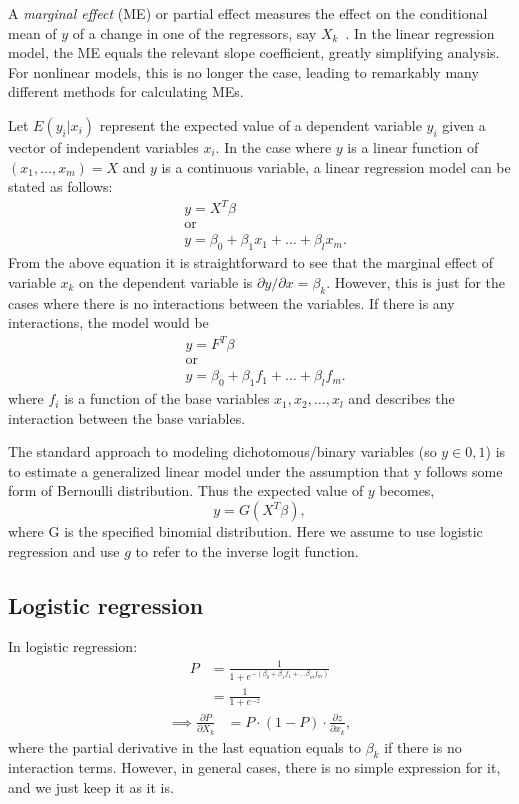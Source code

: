 A \emph{marginal effect} (ME) or partial effect measures the effect on the
conditional mean of $y$ of a change in one of the regressors, say
$X_k$~\cite{cameron2009}. In the linear regression model, the ME equals the
relevant slope coefficient, greatly simplifying analysis. For nonlinear models,
this is no longer the case, leading to remarkably many different methods for
calculating MEs.

Let $E(y_i | x_i)$ represent the expected value of a dependent variable $y_i$
given a vector of independent variables $x_i$. In the case where $y$ is a
linear function of $(x_1, \dots, x_m) = X$ and $y$ is a continuous variable, a
linear regression model can be stated as follows:
\begin{align*}
    & y = X^T\beta \\
    & \text{or} \\
    & y = \beta_0 + \beta_1 x_1 +  \dots  + \beta_l x_m.
\end{align*}
From the above equation it is straightforward to see that the marginal effect of
variable $x_k$ on the dependent variable is $\partial y / \partial x =
\beta_k$. However, this is just for the cases where there is no
interactions between the variables. If there is any interactions, the
model would be
\begin{align*}
    & y = F^T\beta \\
    & \text{or} \\
    & y = \beta_0 + \beta_1 f_1 + \dots + \beta_l f_m.
\end{align*}
where $f_i$ is a function of the base variables $x_1, x_2, \dots, x_l$ and describes the
interaction between the base variables.

The standard approach to modeling dichotomous/binary variables
(so $y \in {0, 1}$) is to estimate a generalized linear model under the
assumption that y follows some form of Bernoulli distribution. Thus the expected
value of $y$ becomes,
\begin{equation*}
    y = G(X^T \beta),
  \end{equation*}
where G is the specified binomial distribution. Here we assume to use
logistic regression and use $g$ to refer to the inverse logit function.

\subsection{Logistic regression} %
\label{sub:logistic_regression}
In logistic regression:
\begin{align*}
  P &= \frac{1}{1 + e^{-(\beta_0 + \beta_1 f_1 + \dots  \beta_m f_m)}} \\
    &= \frac{1}{1 + e^{-z}}
\end{align*}
\begin{align*}
  \implies \frac{\partial P}{\partial X_k} &= P \cdot (1-P) \cdot
  \frac{\partial z}{\partial x_k},
\end{align*}
where the partial derivative in the last equation equals to $\beta_k$
if there is no interaction terms. However, in general cases, there is
no simple expression for it, and we just keep it as it is.

